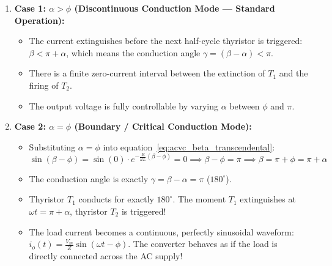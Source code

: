 \documentclass[11pt,a4paper]{article}
\begin{document}
\begin{enumerate}[leftmargin=*]
  \item \textbf{Case 1: $\alpha > \phi$ (Discontinuous Conduction Mode --- Standard Operation):}
  \begin{itemize}
    \item The current extinguishes before the next half-cycle thyristor is triggered: $\beta < \pi + \alpha$, which means the conduction angle $\gamma = (\beta - \alpha) < \pi$.
    \item There is a finite zero-current interval between the extinction of $T_1$ and the firing of $T_2$.
    \item The output voltage is fully controllable by varying $\alpha$ between $\phi$ and $\pi$.
  \end{itemize}

  \item \textbf{Case 2: $\alpha = \phi$ (Boundary / Critical Conduction Mode):}
  \begin{itemize}
    \item Substituting $\alpha = \phi$ into equation~\eqref{eq:acvc_beta_transcendental}:
    \begin{equation}
    \sin(\beta - \phi) = \sin(0) \cdot e^{-\frac{R}{\omega L}(\beta - \phi)} = 0 \implies \beta - \phi = \pi \implies \beta = \pi + \phi = \pi + \alpha
    \end{equation}
    \item The conduction angle is exactly $\gamma = \beta - \alpha = \pi$ ($180^\circ$).
    \item Thyristor $T_1$ conducts for exactly $180^\circ$. The moment $T_1$ extinguishes at $\omega t = \pi + \alpha$, thyristor $T_2$ is triggered!
    \item The load current becomes a continuous, perfectly sinusoidal waveform: $i_o(t) = \frac{V_m}{Z}\sin(\omega t - \phi)$. The converter behaves as if the load is directly connected across the AC supply!
  \end{itemize}


\end{enumerate}
\end{document}
